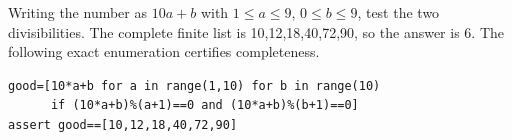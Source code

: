 Writing the number as $10a+b$ with $1\le a\le9$, $0\le b\le9$, test the two divisibilities. The complete finite list is 10,12,18,40,72,90, so the answer is $\boxed6$. The following exact enumeration certifies completeness.
\begin{verbatim}
good=[10*a+b for a in range(1,10) for b in range(10)
      if (10*a+b)%(a+1)==0 and (10*a+b)%(b+1)==0]
assert good==[10,12,18,40,72,90]
\end{verbatim}
